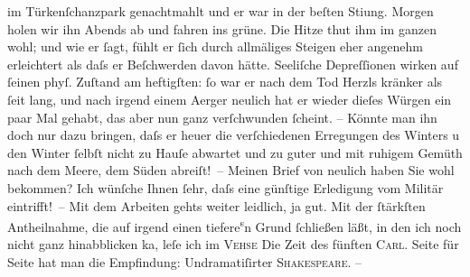 \begin{ledgroupsized}[t]{13cm}
               im Türkenſchanzpark genachtmahlt und er war in der
               beſten Sti{\geminationm}ung. Morgen holen wir ihn Abends ab und
               fahren ins grüne. Die Hitze thut ihm im ganzen wohl; und wie er ſagt, fühlt er ſich
               durch allmäliges Steigen eher angenehm erleichtert als daſs er Beſchwerden davon
               hätte. {\pb}Seeliſche Depreſſionen wirken auf ſeinen phyſ.
               Zuſtand am heftigſten: ſo war er nach dem Tod Herzls kränker als ſeit lang, und nach irgend einem Aerger neulich hat er
               wieder dieſes Würgen ein paar Mal gehabt, das aber nun ganz verſchwunden ſcheint. –
               Könnte man ihn doch nur dazu bringen, daſs er heuer die verſchiedenen Erregungen des
               Winters \introOben{}u den Winter ſelbſt\introOben{} nicht zu Hauſe abwartet und zu
               guter \label{T_L01424_2v}\label{T_L01424_2h} und mit ruhigem Gemüth
                  {\pb}nach dem Meere, dem Süden abreiſt! –\pend
           \pstart
           Meinen Brief von neulich haben Sie wohl bekommen? Ich wünſche Ihnen ſehr, daſs eine
               günſtige Erledigung vom Militär eintrifft! –\pend
           \pstart
           Mit dem Arbeiten gehts weiter leidlich, ja gut. Mit der ſtärkſten Antheilnahme, die
               auf irgend ein\introOben{}en\introOben{} tiefere\substVorne{}\textsuperscript{s}\substDazwischen{}n\substHinten{} Grund ſchließen läßt, in den ich noch nicht ganz hinabblicken ka{\geminationn}, leſe ich im \textsc{Vehse}{ }{\pb}Die Zeit des fünften \textsc{Carl}. Seite für Seite hat man die Empfindung: Undramatiſirter \textsc{Shakespeare}. –\pend

\end{ledgroupsized}
